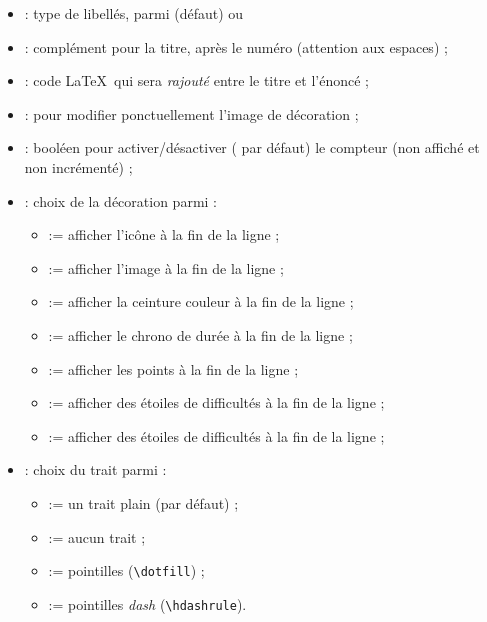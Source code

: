 \documentclass[french,11pt,a4paper]{article}
\begin{document}
\begin{itemize}
	\item {} : type de libellés, parmi  (défaut) ou 
	\item {} : complément pour la titre, après le numéro (attention aux espaces) ;
	\item {} : code \LaTeX\ qui sera \textit{rajouté} entre le titre et l'énoncé ;
	\item {} : pour modifier ponctuellement l'image de décoration ;
	\item {} : booléen pour activer/désactiver ( par défaut) le compteur (non affiché et non incrémenté) ;
	\item {} : choix de la décoration parmi :
	\begin{itemize}
		\item {} := afficher l'icône  à la fin de la ligne ;
		\item {} := afficher l'image  à la fin de la ligne ;
		\item {} := afficher la ceinture couleur  à la fin de la ligne ;
		\item {} := afficher le chrono de durée  à la fin de la ligne ;
		\item {} := afficher les points  à la fin de la ligne ;
		\item {} := afficher des étoiles de difficultés à la fin de la ligne ;
		\item {} := afficher des étoiles de difficultés à la fin de la ligne ;
	\end{itemize}
	\item {} : choix du trait parmi :
	\begin{itemize}
		\item {} := un trait plain (par défaut) ;
		\item {} := aucun trait ;
		\item {} := pointilles (\texttt{\textbackslash dotfill}) ;
		\item {} := pointilles \textit{dash} (\texttt{\textbackslash hdashrule}).
	\end{itemize}
\end{itemize}
\end{document}
